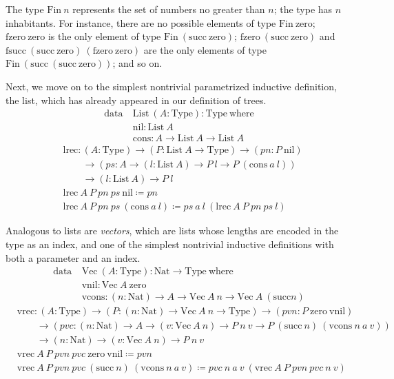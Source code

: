 \documentclass{report}
\newcommand{\Nat}{\const{Nat}}
\newcommand{\zero}{\const{zero}}
\renewcommand{\succ}{\const{succ}}
\newcommand{\List}{\const{List}}
\newcommand{\nil}{\const{nil}}
\newcommand{\cons}{\const{cons}}
\newcommand{\Fin}{\const{Fin}}
\newcommand{\fzero}{\const{fzero}}
\newcommand{\fsucc}{\const{fsucc}}
\newcommand{\Vector}{\const{Vec}}
\newcommand{\vnil}{\const{vnil}}
\newcommand{\vcons}{\const{vcons}}
\newcommand{\const}[1]{\text{#1}}
\newcommand{\data}{\const{data}}
\newcommand{\Type}{\const{Type}}
\newcommand{\where}{\const{where}}
\begin{document}
The type $\Fin ~ n$ represents the set of numbers no greater than $n$; the type has $n$ inhabitants. For instance, there are no possible elements of type $\Fin ~ \zero$; $\fzero ~ \zero$ is the only element of type $\Fin ~ (\succ ~ \zero)$; $\fzero ~ (\succ ~ \zero)$ and $\fsucc ~ (\succ ~ \zero) ~ (\fzero ~ \zero)$ are the only elements of type $\Fin ~ (\succ ~ (\succ ~ \zero))$; and so on.

Next, we move on to the simplest nontrivial parametrized inductive definition, the list, which has already appeared in our definition of trees.
%
\begin{align*}
    \data ~ &\List ~ (A: \Type): \Type ~ \where \\
    &\nil: \List ~ A \\
    &\cons : A \to \List ~ A \to \List ~ A
\end{align*}
\begin{align*}
    &\const{lrec}: (A: \Type) \to (P: \List ~ A \to \Type) \to (pn: P ~ \nil) \\
    &\qquad\to (ps: A \to (l: \List ~ A) \to P ~ l \to P ~ (\cons ~ a ~ l)) \\
    &\qquad\to (l: \List ~ A) \to P ~ l \\
    &\const{lrec} ~ A ~ P ~ pn ~ ps ~ \nil \coloneqq pn \\
    &\const{lrec} ~ A ~ P ~ pn ~ ps ~ (\cons ~ a ~ l) \coloneqq ps ~ a ~ l ~ (\const{lrec} ~ A ~ P ~ pn ~ ps ~ l)
\end{align*}

Analogous to lists are \emph{vectors}, which are lists whose lengths are encoded in the type as an index, and one of the simplest nontrivial inductive definitions with both a parameter and an index.
%
\begin{align*}
    \data ~ &\Vector ~ (A: \Type): \Nat \to \Type ~ \where \\
    &\vnil: \Vector ~ A ~ \zero \\
    &\vcons: (n: \Nat) \to A \to \Vector ~ A ~ n \to \Vector ~ A ~ (\succ n)
\end{align*}
\begin{align*}
    &\const{vrec}: (A: \Type) \to (P: (n: \Nat) \to \Vector ~ A ~ n \to \Type) \to (pvn: P ~ \zero ~ \vnil) \\
    &\qquad\to (pvc: (n: \Nat) \to A \to (v: \Vector ~ A ~ n) \to P ~ n ~ v \to P ~ (\succ ~ n) ~ (\vcons ~ n ~ a ~ v)) \\
    &\qquad\to (n: \Nat) \to (v: \Vector ~ A ~ n) \to P ~ n ~ v \\
    &\const{vrec} ~ A ~ P ~ pvn ~ pvc ~ \zero ~ \vnil \coloneqq pvn \\
    &\const{vrec} ~ A ~ P ~ pvn ~ pvc ~ (\succ ~ n) ~ (\vcons ~ n ~ a ~ v) \coloneqq pvc ~ n ~ a ~ v ~ (\const{vrec} ~ A ~ P ~ pvn ~ pvc ~ n ~ v)
\end{align*}
\end{document}
